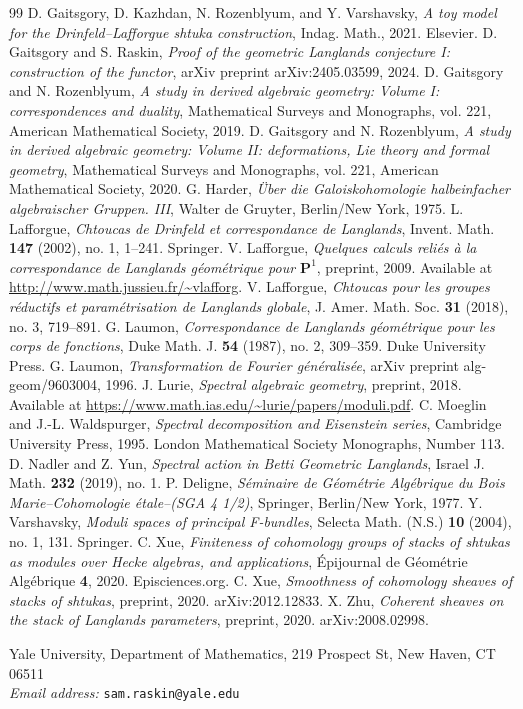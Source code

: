 \begin{thebibliography}{99}
 D. Gaitsgory, D. Kazhdan, N. Rozenblyum, and Y. Varshavsky, \emph{A toy model for the Drinfeld--Lafforgue shtuka construction}, Indag. Math., 2021. Elsevier.
 D. Gaitsgory and S. Raskin, \emph{Proof of the geometric Langlands conjecture I: construction of the functor}, arXiv preprint arXiv:2405.03599, 2024.
 D. Gaitsgory and N. Rozenblyum, \emph{A study in derived algebraic geometry: Volume I: correspondences and duality}, Mathematical Surveys and Monographs, vol. 221, American Mathematical Society, 2019.
 D. Gaitsgory and N. Rozenblyum, \emph{A study in derived algebraic geometry: Volume II: deformations, Lie theory and formal geometry}, Mathematical Surveys and Monographs, vol. 221, American Mathematical Society, 2020.
 G. Harder, \emph{\"Uber die Galoiskohomologie halbeinfacher algebraischer Gruppen. III}, Walter de Gruyter, Berlin/New York, 1975.
 L. Lafforgue, \emph{Chtoucas de Drinfeld et correspondance de Langlands}, Invent. Math. \textbf{147} (2002), no. 1, 1--241. Springer.
 V. Lafforgue, \emph{Quelques calculs reli\'es \`a la correspondance de Langlands g\'eom\'etrique pour $\mathbf{P}^1$}, preprint, 2009. Available at \url{http://www.math.jussieu.fr/~vlafforg}.
 V. Lafforgue, \emph{Chtoucas pour les groupes r\'eductifs et param\'etrisation de Langlands globale}, J. Amer. Math. Soc. \textbf{31} (2018), no. 3, 719--891.
 G. Laumon, \emph{Correspondance de Langlands g\'eom\'etrique pour les corps de fonctions}, Duke Math. J. \textbf{54} (1987), no. 2, 309--359. Duke University Press.
 G. Laumon, \emph{Transformation de Fourier g\'en\'eralis\'ee}, arXiv preprint alg-geom/9603004, 1996.
 J. Lurie, \emph{Spectral algebraic geometry}, preprint, 2018. Available at \url{https://www.math.ias.edu/~lurie/papers/moduli.pdf}.
 C. Moeglin and J.-L. Waldspurger, \emph{Spectral decomposition and Eisenstein series}, Cambridge University Press, 1995. London Mathematical Society Monographs, Number 113.
 D. Nadler and Z. Yun, \emph{Spectral action in Betti Geometric Langlands}, Israel J. Math. \textbf{232} (2019), no. 1.
 P. Deligne, \emph{S\'eminaire de G\'eom\'etrie Alg\'ebrique du Bois Marie--Cohomologie \'etale--(SGA 4 1/2)}, Springer, Berlin/New York, 1977.
 Y. Varshavsky, \emph{Moduli spaces of principal F-bundles}, Selecta Math. (N.S.) \textbf{10} (2004), no. 1, 131. Springer.
 C. Xue, \emph{Finiteness of cohomology groups of stacks of shtukas as modules over Hecke algebras, and applications}, \'Epijournal de G\'eom\'etrie Alg\'ebrique \textbf{4}, 2020. Episciences.org.
 C. Xue, \emph{Smoothness of cohomology sheaves of stacks of shtukas}, preprint, 2020. arXiv:2012.12833.
 X. Zhu, \emph{Coherent sheaves on the stack of Langlands parameters}, preprint, 2020. arXiv:2008.02998.

\medskip
\noindent Yale University, Department of Mathematics, 219 Prospect St, New Haven, CT 06511\\
\noindent\emph{Email address:} \texttt{sam.raskin@yale.edu}
\end{thebibliography}
